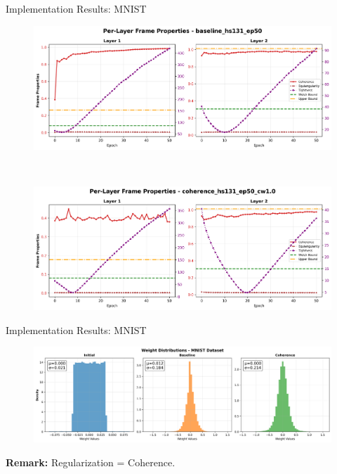 \documentclass[9pt,dvipsnames]{beamer}
\begin{document}
\begin{frame}{Implementation Results: MNIST}
    \begin{figure}[H]
        \centering
        \begin{minipage}[b]{\textwidth}
            \centering
            \includegraphics[width=\textwidth,height=0.45\textheight,keepaspectratio]{../plots/mlp/mnist/hs131_ep50/baseline_hs131_ep50_coherence_analysis.png}
        \end{minipage}\\[0.1em]
        \begin{minipage}[b]{\textwidth}
            \centering
            \includegraphics[width=\textwidth,height=0.45\textheight,keepaspectratio]{../plots/mlp/mnist/hs131_ep50/coherence_hs131_ep50_cw1.0_coherence_analysis.png}
        \end{minipage}
    \end{figure}
\end{frame}
\begin{frame}{Implementation Results: MNIST}
    \begin{figure}[H]
        \centering
        \includegraphics[width=\textwidth]{../plots/mlp/mnist/hs131_ep50/weights_distribution_cw1.0_a0.0_b0.0.png}
    \end{figure}

	\textbf{Remark:} Regularization = Coherence.
\end{frame}
\end{document}
